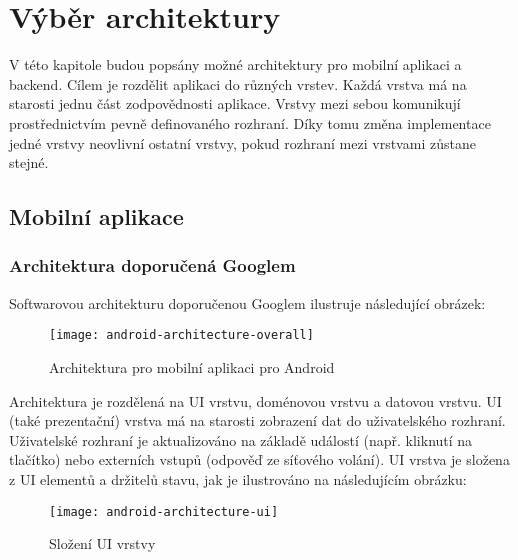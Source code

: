 \chapter{Výběr architektury}

\begin{chapterabstract}
	V této kapitole budou popsány možné architektury pro mobilní aplikaci a backend. Cílem je rozdělit aplikaci do různých vrstev. Každá vrstva má na starosti jednu část zodpovědnosti aplikace. Vrstvy mezi sebou komunikují prostřednictvím pevně definovaného rozhraní. Díky tomu změna implementace jedné vrstvy neovlivní ostatní vrstvy, pokud rozhraní mezi vrstvami zůstane stejné.
\end{chapterabstract}

\section{Mobilní aplikace}

\subsection{Architektura doporučená Googlem}
\label{subsec:architecture-google}
Softwarovou architekturu doporučenou Googlem \cite{android-architecture} ilustruje následující obrázek:

\begin{figure}[h!]
	\centering
	
	\texttt{[image: android-architecture-overall]}
	
	\caption{Architektura pro mobilní aplikaci pro Android \cite{android-architecture}}
	\label{fig:android-architecture-overall}
\end{figure}

\noindent Architektura je rozdělená na UI vrstvu, doménovou vrstvu a datovou vrstvu. UI (také prezentační) vrstva má na starosti zobrazení dat do uživatelského rozhraní. Uživatelské rozhraní je aktualizováno na základě událostí (např. kliknutí na tlačítko) nebo externích vstupů (odpověď ze síťového volání). UI vrstva je složena z UI elementů a držitelů stavu, jak je ilustrováno na následujícím obrázku:

\begin{figure}[H]
	\centering
	
	\texttt{[image: android-architecture-ui]}
	
	\caption{Složení UI vrstvy \cite{android-architecture}}
	\label{fig:android-architecture-ui}
\end{figure}

